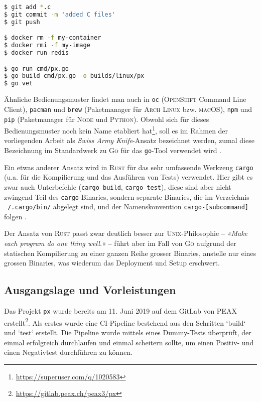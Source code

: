 \begin{lstlisting}[language=bash,caption={Einie Kommandozeilenbeispiele mit Haupt- und Unterbefehl}]
$ git add *.c
$ git commit -m 'added C files'
$ git push

$ docker rm -f my-container
$ docker rmi -f my-image
$ docker run redis

$ go run cmd/px.go
$ go build cmd/px.go -o builds/linux/px
$ go vet
\end{lstlisting}

Ähnliche Bedienungsmuster findet man auch in \texttt{oc} (\textsc{OpenShift} Command Line Client), \texttt{pacman} und \texttt{brew} (Paketmanager für \textsc{Arch Linux} bzw. \textsc{macOS}), \texttt{npm} und \texttt{pip} (Paketmanager für \textsc{Node} und \textsc{Python}). Obwohl sich für dieses Bedienungsmuster noch kein Name etabliert hat\footnote{\url{https://superuser.com/q/1020583}}, soll es im Rahmen der vorliegenden Arbeit als \textit{Swiss Army Knife}-Ansatz bezeichnet werden, zumal diese Bezeichnung im Standardwerk zu \textsc{Go} für das \texttt{go}-Tool verwendet wird \cite{gopl}.

Ein etwas anderer Ansatz wird in \textsc{Rust} für das sehr umfassende Werkzeug \texttt{cargo} (u.a. für die Kompilierung und das Ausführen von Tests) verwendet. Hier gibt es zwar auch Unterbefehle (\texttt{cargo build}, \texttt{cargo test}), diese sind aber nicht zwingend Teil des \texttt{cargo}-Binaries, sondern separate Binaries, die im Verzeichnis \texttt{~/.cargo/bin/} abgelegt sind, und der Namenskonvention \texttt{cargo-[subcommand]} folgen \cite[Kapitel 14.5]{rust-book}.

Der Ansatz von \textsc{Rust} passt zwar deutlich besser zur \textsc{Unix}-Philosophie ‒ \textit{«Make each program do one thing well.»} \cite[p. 3]{unixtimesharing} ‒ führt aber im Fall von \textsc{Go} aufgrund der statischen Kompilierung zu einer ganzen Reihe grosser Binaries, anstelle nur eines grossen Binaries, was wiederum das Deployment und Setup erschwert.

\subsection{Ausgangslage und Vorleistungen}

Das Projekt \texttt{px} wurde bereits am 11. Juni 2019 auf dem GitLab von PEAX erstellt\footnote{\url{https://gitlab.peax.ch/peax3/px}}. Als erstes wurde eine CI-Pipeline bestehend aus den Schritten `build` und `test` erstellt. Die Pipeline wurde mittels eines Dummy-Tests überprüft, der einmal erfolgreich durchlaufen und einmal scheitern sollte, um einen Positiv- und einen Negativtest durchführen zu können.

